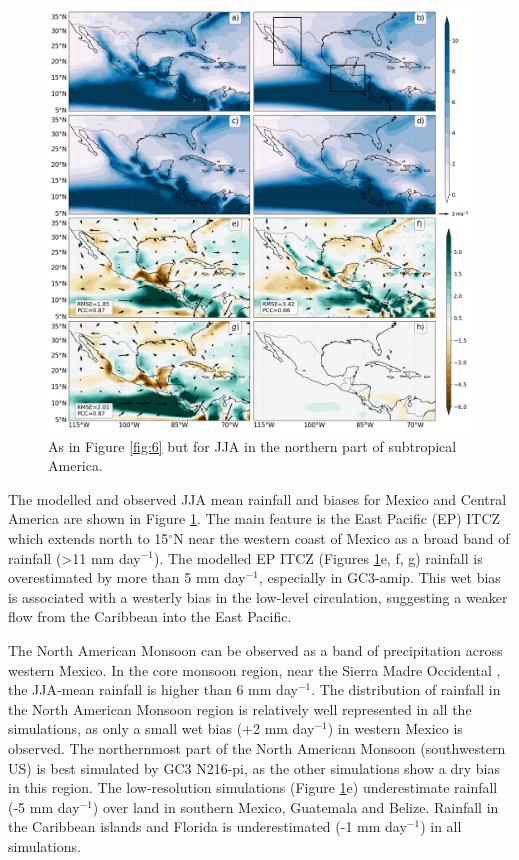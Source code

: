 \begin{figure}
\centering
 \includegraphics[width=0.95\linewidth]{figures/Fig8.png}
\caption{ As in Figure \ref{fig:6} but for JJA in the northern part of subtropical America.   }
\label{fig:7}
\end{figure}

The modelled and observed JJA mean rainfall and biases for Mexico and Central America are shown in Figure \ref{fig:7}.
The main feature is the East Pacific (EP) ITCZ which extends north to 15$^\circ$N near the western coast of Mexico as a broad band of rainfall (>11 mm day$^{-1}$).
 The modelled EP ITCZ (Figures \ref{fig:7}e, f, g) rainfall is overestimated by more than 5 mm day$^{-1}$, especially in GC3-amip. This wet bias is associated with a westerly bias in the low-level circulation, suggesting a weaker flow from the Caribbean into the East Pacific.

The North American Monsoon can be observed as a band of precipitation across western Mexico. In the core monsoon region, near the Sierra Madre Occidental \citep{adams1997, zhou2016}, the JJA-mean rainfall is higher than 6 mm day$^{-1}$. %
The distribution of rainfall in the North American Monsoon region is relatively well represented in all the simulations, as only a small wet bias (+2 mm day$^{-1}$) in western Mexico is observed.
The northernmost part of the North American Monsoon (southwestern US) is best simulated by GC3 N216-pi, as the other simulations show a dry bias in this region.
The low-resolution simulations (Figure \ref{fig:7}e) underestimate rainfall (-5 mm day$^{-1}$) over land in southern Mexico, Guatemala and Belize.
Rainfall in the Caribbean islands and Florida is underestimated (-1 mm day$^{-1}$) in all simulations.

